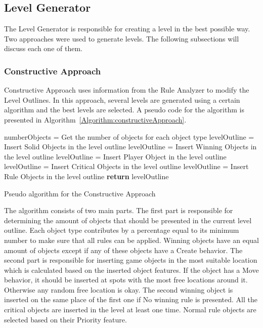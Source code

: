 \documentclass[letterpaper]{article}
\newcommand{\algref}[1]{Algorithm~\ref{Algorithm:#1}}
\begin{document}
\subsection{Level Generator}
The Level Generator is responsible for creating a level in the best possible way. Two approaches were used to generate levels. The following subsections will discuss each one of them.

\subsubsection{Constructive Approach}
Constructive Approach uses information from the Rule Analyzer to modify the Level Outlines. In this approach, several levels are generated using a certain algorithm and the best levels are selected. A pseudo code for the algorithm is presented in \algref{constructiveApproach}.\\\par

\setlength{\textfloatsep}{0pt}
\begin{algorithm}[ht]
	\BlankLine
	numberObjects = Get the number of objects for each object type\;
	\BlankLine
	levelOutline = Insert Solid Objects in the level outline\;
	levelOutline = Insert Winning Objects in the level outline\;
	levelOutline = Insert Player Object in the level outline\;
	levelOutline = Insert Critical Objects in the level outline\;
	levelOutline = Insert Rule Objects in the level outline\;
	\BlankLine
	\textbf{return} levelOutline\;
	\caption{Pseudo algorithm for the Constructive Approach}
	\label{Algorithm:constructiveApproach}
\end{algorithm}
\setlength{\textfloatsep}{10pt}

The algorithm consists of two main parts. The first part is responsible for determining the amount of objects that should be presented in the current level outline. Each object type contributes by a percentage equal to its minimum number to make sure that all rules can be applied. Winning objects have an equal amount of objects except if any of these objects have a Create behavior. The second part is responsible for inserting game objects in the most suitable location which is calculated based on the inserted object features. If the object has a Move behavior, it should be inserted at spots with the most free locations around it. Otherwise any random free location is okay. The second winning object is inserted on the same place of the first one if No winning rule is presented. All the critical objects are inserted in the level at least one time. Normal rule objects are selected based on their Priority feature.
\end{document}
